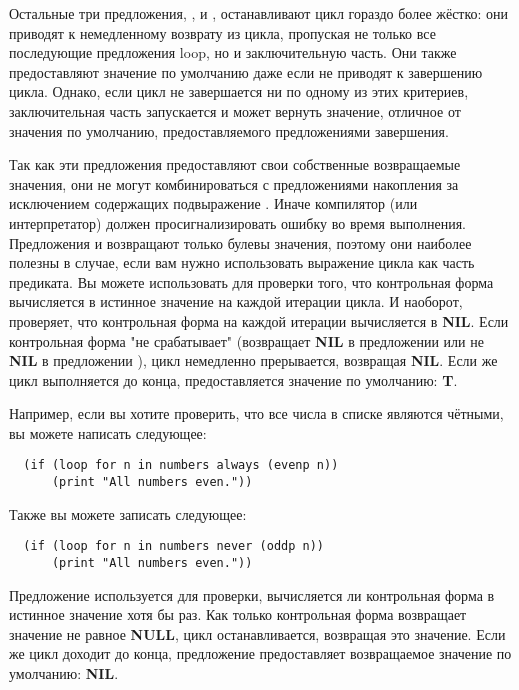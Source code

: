 Остальные три предложения, ,  и , останавливают
цикл гораздо более жёстко: они приводят к немедленному возврату из цикла, пропуская не
только все последующие предложения loop, но и заключительную часть. Они также
предоставляют значение по умолчанию даже если не приводят к завершению цикла. Однако, если
цикл не завершается ни по одному из этих критериев, заключительная часть запускается и
может вернуть значение, отличное от значения по умолчанию, предоставляемого предложениями
завершения.

Так как эти предложения предоставляют свои собственные возвращаемые значения, они не могут
комбинироваться с предложениями накопления за исключением содержащих подвыражение
. Иначе компилятор (или интерпретатор) должен просигнализировать ошибку во
время выполнения. Предложения  и  возвращают только булевы
значения, поэтому они наиболее полезны в случае, если вам нужно использовать выражение
цикла как часть предиката. Вы можете использовать  для проверки того, что
контрольная форма вычисляется в истинное значение на каждой итерации цикла. И наоборот,
 проверяет, что контрольная форма на каждой итерации вычисляется в
\textbf{NIL}. Если контрольная форма "не срабатывает" (возвращает \textbf{NIL} в
предложении  или не \textbf{NIL} в предложении ), цикл немедленно
прерывается, возвращая \textbf{NIL}. Если же цикл выполняется до конца, предоставляется
значение по умолчанию: \textbf{T}.

Например, если вы хотите проверить, что все числа в списке  являются
чётными, вы можете написать следующее:

\begin{lstlisting}
  (if (loop for n in numbers always (evenp n))
      (print "All numbers even."))
\end{lstlisting}

Также вы можете записать следующее:

\begin{lstlisting}
  (if (loop for n in numbers never (oddp n))
      (print "All numbers even."))
\end{lstlisting}

Предложение  используется для проверки, вычисляется ли контрольная форма в
истинное значение хотя бы раз. Как только контрольная форма возвращает значение не равное
\textbf{NULL}, цикл останавливается, возвращая это значение. Если же цикл доходит до
конца, предложение  предоставляет возвращаемое значение по умолчанию:
\textbf{NIL}.

